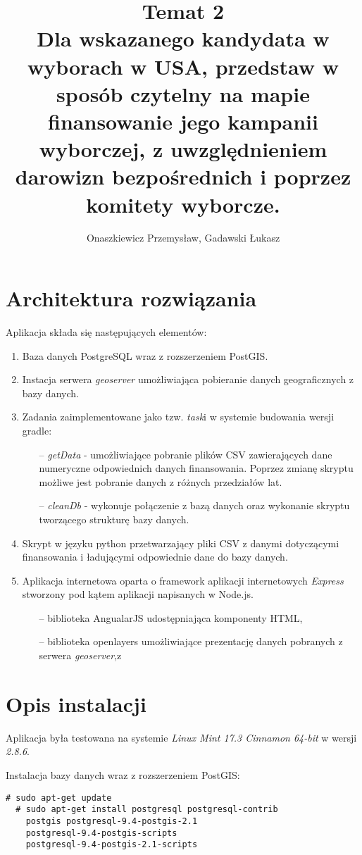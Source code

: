 \documentclass[10pt,a4paper]{article}
\author{Onaszkiewicz Przemysław, Gadawski Łukasz}
\title{Temat 2\\ Dla wskazanego kandydata w wyborach w USA, przedstaw w sposób czytelny na mapie finansowanie jego kampanii wyborczej, z uwzględnieniem darowizn bezpośrednich i poprzez komitety wyborcze. 
}
\begin{document}
\maketitle

\section{Architektura rozwiązania}
Aplikacja składa się następujących elementów:
\begin{enumerate}
\item Baza danych PostgreSQL wraz z rozszerzeniem PostGIS.
\item Instacja serwera \textit{geoserver} umożliwiająca pobieranie danych geograficznych z bazy danych.
\item Zadania zaimplementowane jako tzw. \textit{task}i w systemie budowania wersji gradle:
\begin{itemize}
\item[--] \textit{getData} - umożliwiające pobranie plików CSV zawierających dane numeryczne odpowiednich danych finansowania. Poprzez zmianę skryptu możliwe jest pobranie danych z różnych przedziałów lat.
\item[--] \textit{cleanDb} - wykonuje połączenie z bazą danych oraz wykonanie skryptu tworzącego strukturę bazy danych.
\end{itemize} 
\item Skrypt w języku python przetwarzający pliki CSV z danymi dotyczącymi finansowania i ładującymi odpowiednie dane do bazy danych.
\item Aplikacja internetowa oparta o framework aplikacji internetowych \textit{Express} stworzony pod kątem aplikacji napisanych w Node.js.
\begin{itemize}
\item[--] biblioteka AngualarJS udostępniająca komponenty HTML,
\item[--] biblioteka openlayers umożliwiające prezentację danych pobranych z serwera \textit{geoserver},z
\end{itemize}
\end{enumerate}
\section{Opis instalacji}
Aplikacja była testowana na systemie \textit{Linux Mint 17.3 Cinnamon 64-bit} w wersji \textit{2.8.6}. 

\bigskip
Instalacja bazy danych wraz z rozszerzeniem PostGIS:
\begin{lstlisting}[style=BashInputStyle]
  # sudo apt-get update
  # sudo apt-get install postgresql postgresql-contrib 
  	postgis postgresql-9.4-postgis-2.1
  	postgresql-9.4-postgis-scripts 
  	postgresql-9.4-postgis-2.1-scripts
\end{lstlisting}
\end{document}
